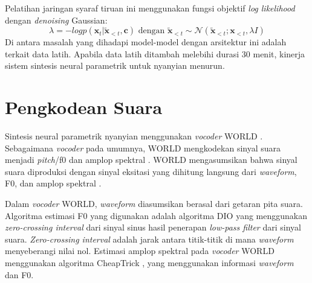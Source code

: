 Pelatihan jaringan syaraf tiruan ini menggunakan fungsi objektif \textit{log likelihood} dengan \textit{denoising} Gaussian:\parencite{bonada2017singing}
\begin{equation}
    \lambda = -log p(\mathbf{x}_t|\mathbf{\tilde{x}}_{<t},\mathbf{c}) \text{ dengan } \mathbf{\tilde{x}}_{<t} \sim \mathcal{N}(\mathbf{\tilde{x}}_{<t}; \mathbf{x}_{<t},\lambda I )
\end{equation}
Di antara masalah yang dihadapi model-model dengan arsitektur ini adalah terkait data latih. Apabila data latih ditambah melebihi durasi 30 menit, kinerja sistem sintesis neural parametrik untuk nyanyian menurun. \parencite{bonada2017singing}

\section{Pengkodean Suara} \label{voice coding}

Sintesis neural parametrik nyanyian \parencite{bonada2017singing} menggunakan \textit{vocoder} WORLD \parencite{morise2016world}. Sebagaimana \textit{vocoder} pada umumnya, WORLD mengkodekan sinyal suara menjadi \textit{pitch}/f0 dan amplop spektral \parencite{dudley1939vocoder}. WORLD mengasumsikan bahwa sinyal suara diproduksi dengan sinyal eksitasi yang dihitung langsung dari \textit{waveform}, F0, dan amplop spektral \parencite{morise2016world}.

Dalam \textit{vocoder} WORLD, \textit{waveform} diasumsikan berasal dari getaran pita suara. Algoritma estimasi F0 yang digunakan adalah algoritma DIO \parencite{morise2009fast} yang menggunakan \textit{zero-crossing interval} dari sinyal sinus hasil penerapan \textit{low-pass filter} dari sinyal suara. \textit{Zero-crossing interval} adalah jarak antara titik-titik di mana \textit{waveform} menyeberangi nilai nol. Estimasi amplop spektral pada \textit{vocoder} WORLD menggunakan algoritma CheapTrick \parencite{morise2015cheaptrick}, yang menggunakan informasi \textit{waveform} dan F0.

